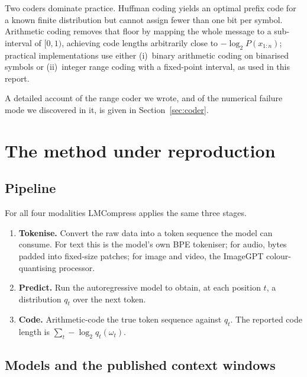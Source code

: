 \documentclass[11pt,a4paper]{article}
\begin{document}
Two coders dominate practice. Huffman coding yields an optimal prefix code for a
known finite distribution but cannot assign fewer than one bit per symbol.
Arithmetic coding removes that floor by mapping the whole message to a
sub-interval of $[0,1)$, achieving code lengths arbitrarily close to
$-\log_2 P(x_{1:n})$; practical implementations use either (i)~binary
arithmetic coding on binarised symbols or (ii)~integer range coding with a
fixed-point interval, as used in this report.

A detailed account of the range coder we wrote, and of the numerical failure mode
we discovered in it, is given in Section~\ref{sec:coder}.

\section{The method under reproduction}

\subsection{Pipeline}

For all four modalities LMCompress applies the same three stages.

\begin{enumerate}[leftmargin=1.4em,itemsep=2pt]
\item \textbf{Tokenise.} Convert the raw data into a token sequence the model can
      consume. For text this is the model's own BPE tokeniser; for audio, bytes
      padded into fixed-size patches; for image and video, the ImageGPT
      colour-quantising processor.
\item \textbf{Predict.} Run the autoregressive model to obtain, at each position
      $t$, a distribution $q_t$ over the next token.
\item \textbf{Code.} Arithmetic-code the true token sequence against $q_t$. The
      reported code length is $\sum_t -\log_2 q_t(\omega_t)$.
\end{enumerate}

\subsection{Models and the published context windows}
\end{document}
